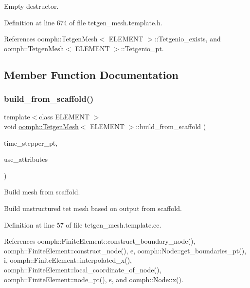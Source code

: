 Empty destructor. 



Definition at line 674 of file tetgen\+\_\+mesh.\+template.\+h.



References oomph\+::\+Tetgen\+Mesh$<$ E\+L\+E\+M\+E\+N\+T $>$\+::\+Tetgenio\+\_\+exists, and oomph\+::\+Tetgen\+Mesh$<$ E\+L\+E\+M\+E\+N\+T $>$\+::\+Tetgenio\+\_\+pt.



\subsection{Member Function Documentation}
\mbox{\label{classoomph_1_1TetgenMesh_a3b0d214cb14243f7ecc2c82e6641930b}} 
\subsubsection{\texorpdfstring{build\+\_\+from\+\_\+scaffold()}{build\_from\_scaffold()}}
{\footnotesize\ttfamily template$<$class E\+L\+E\+M\+E\+NT $>$ \\
void \hyperlink{classoomph_1_1TetgenMesh}{oomph\+::\+Tetgen\+Mesh}$<$ E\+L\+E\+M\+E\+NT $>$\+::build\+\_\+from\+\_\+scaffold (\begin{DoxyParamCaption}\item[{\hyperlink{classoomph_1_1TimeStepper}{Time\+Stepper} $\ast$}]{time\+\_\+stepper\+\_\+pt,  }\item[{const bool \&}]{use\+\_\+attributes }\end{DoxyParamCaption})\hspace{0.3cm}{\ttfamily [protected]}}



Build mesh from scaffold. 

Build unstructured tet mesh based on output from scaffold. 

Definition at line 57 of file tetgen\+\_\+mesh.\+template.\+cc.



References oomph\+::\+Finite\+Element\+::construct\+\_\+boundary\+\_\+node(), oomph\+::\+Finite\+Element\+::construct\+\_\+node(), e, oomph\+::\+Node\+::get\+\_\+boundaries\+\_\+pt(), i, oomph\+::\+Finite\+Element\+::interpolated\+\_\+x(), oomph\+::\+Finite\+Element\+::local\+\_\+coordinate\+\_\+of\+\_\+node(), oomph\+::\+Finite\+Element\+::node\+\_\+pt(), s, and oomph\+::\+Node\+::x().



